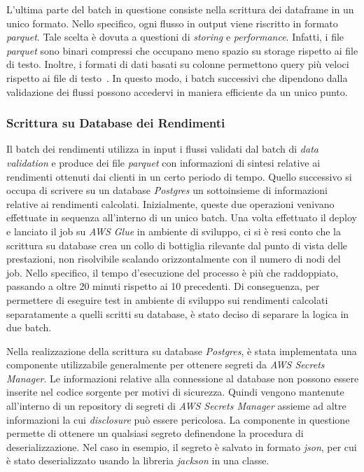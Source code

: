 L'ultima parte del batch in questione consiste nella scrittura dei dataframe in un unico formato.
Nello specifico, ogni flusso in output viene riscritto in formato \textit{parquet}.
Tale scelta è dovuta a questioni di \textit{storing} e \textit{performance}.
Infatti, i file \textit{parquet} sono binari compressi che occupano meno spazio su storage rispetto ai file di testo.
Inoltre, i formati di dati basati su colonne permettono query più veloci rispetto ai file di testo~\cite{parquet}.
In questo modo, i batch successivi che dipendono dalla validazione dei flussi possono accedervi in maniera efficiente da un unico punto.

\subsubsection{Scrittura su Database dei Rendimenti}\label{subsubsec:postgres}
Il batch dei rendimenti utilizza in input i flussi validati dal batch di \textit{data validation} e produce dei file \textit{parquet} con informazioni di sintesi relative ai rendimenti ottenuti dai clienti in un certo periodo di tempo.
Quello successivo si occupa di scrivere su un database \textit{Postgres} un sottoinsieme di informazioni relative ai rendimenti calcolati.
Inizialmente, queste due operazioni venivano effettuate in sequenza all'interno di un unico batch.
Una volta effettuato il deploy e lanciato il job su \textit{AWS Glue} in ambiente di sviluppo, ci si è resi conto che la scrittura su database crea un collo di bottiglia rilevante dal punto di vista delle prestazioni, non risolvibile scalando orizzontalmente con il numero di nodi del job.
Nello specifico, il tempo d'esecuzione del processo è più che raddoppiato, passando a oltre 20 minuti rispetto ai 10 precedenti.
Di conseguenza, per permettere di eseguire test in ambiente di sviluppo sui rendimenti calcolati separatamente a quelli scritti su database, è stato deciso di separare la logica in due batch.

Nella realizzazione della scrittura su database \textit{Postgres}, è stata implementata una componente utilizzabile generalmente per ottenere segreti da \textit{AWS Secrets Manager}.
Le informazioni relative alla connessione al database non possono essere inserite nel codice sorgente per motivi di sicurezza.
Quindi vengono mantenute all'interno di un repository di segreti di \textit{AWS Secrets Manager} assieme ad altre informazioni la cui \textit{disclosure} può essere pericolosa.
La componente in questione permette di ottenere un qualsiasi segreto definendone la procedura di deserializzazione.
Nel caso in esempio, il segreto è salvato in formato \textit{json}, per cui è stato deserializzato usando la libreria \textit{jackson} in una classe.

